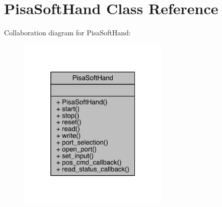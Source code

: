 \hypertarget{class_pisa_soft_hand}{}\section{Pisa\+Soft\+Hand Class Reference}
\label{class_pisa_soft_hand}


Collaboration diagram for Pisa\+Soft\+Hand\+:
\nopagebreak
\begin{figure}[H]
\begin{center}
\leavevmode
\includegraphics[width=205pt]{class_pisa_soft_hand__coll__graph}
\end{center}
\end{figure}
